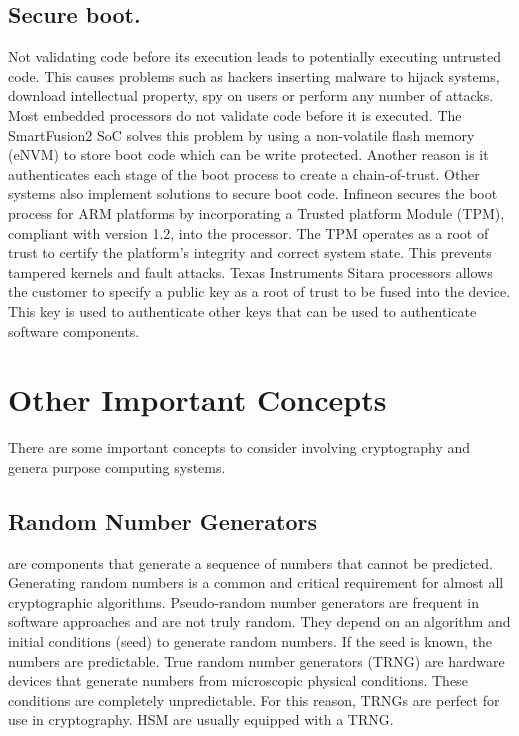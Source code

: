 \subsection*{Secure boot.}
Not validating code before its execution leads to potentially executing untrusted code. This causes problems such as hackers inserting malware to hijack systems, download intellectual property, spy on users or perform any number of attacks.
Most embedded processors do not validate code before it is executed. The SmartFusion2 SoC solves this problem by using a non-volatile flash memory (eNVM) to store boot code which can be write protected. Another reason is it authenticates each stage of the boot process to create a chain-of-trust.
Other systems also implement solutions to secure boot code. Infineon secures the boot process for ARM platforms by incorporating a Trusted platform Module (TPM), compliant with version 1.2, into the processor. The TPM operates as a root of trust to certify the platform's integrity and correct system state. This prevents tampered kernels and fault attacks.
Texas Instruments Sitara processors allows the customer to specify a public key as a root of trust to be fused into the device. This key is used to authenticate other keys that can be used to authenticate software components.

\section{Other Important Concepts} \label{chap:background:other}

There are some important concepts to consider involving cryptography and genera purpose computing systems.

\subsection{Random Number Generators} are components that generate a sequence of numbers that cannot be predicted. Generating random numbers is a common and critical requirement for almost all cryptographic algorithms. Pseudo-random number generators are frequent in software approaches and are not truly random. They depend on an algorithm and initial conditions (seed) to generate random numbers. If the seed is known, the numbers are predictable.
True random number generators (TRNG) are hardware devices that generate numbers from microscopic physical conditions. These conditions are completely unpredictable. For this reason, TRNGs are perfect for use in cryptography. HSM are usually equipped with a TRNG.


